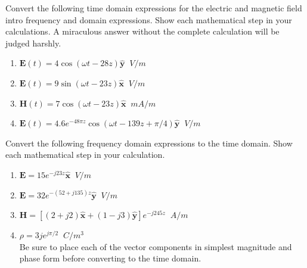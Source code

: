 \documentclass[11pt]{article}
\begin{document}
\makeAssignmentTitle

\begin{homeworkProblem}

Convert the following time domain expressions for the electric and magnetic field intro frequency and domain expressions. 
Show each mathematical step in your calculations. A miraculous answer without the complete calculation will be judged harshly.

\begin{enumerate}[label=(\alph*), topsep=5pt, itemsep=0pt]
    \item $\mathbf{E}(t)=4 \cos (\omega t-28 z) \hat{\mathbf{y}} \;\; \unit{V/m}$
    \item $\mathbf{E}(t)=9 \sin (\omega t-23 z) \hat{\mathbf{x}} \;\; \unit{V/m}$
    \item $\mathbf{H}(t)=7 \cos (\omega t-23 z) \hat{\mathbf{x}} \;\; \unit{mA/m}$
    \item $\mathbf{E}(t)=4.6 e^{-48 \pi z} \cos (\omega t-139 z+\pi / 4) \hat{\mathbf{y}} \;\; \unit{V/m}$
\end{enumerate} \vspace{1\baselineskip}

\solution



\end{homeworkProblem}

\pagebreak

\begin{homeworkProblem}

Convert the following frequency domain expressions to the time domain. Show each mathematical step in your calculation.

\begin{enumerate}[label=(\alph*), topsep=5pt, itemsep=0pt]
    \item $\mathbf{E} = 15 e^{-j 23 z} \hat{\mathbf{x}} \;\; \unit{V/m}$
    \item $\mathbf{E} = 32 e^{-(52 + j 135) z} \hat{\mathbf{y}} \;\; \unit{V/m}$
    \item $\mathbf{H} = [(2 + j2) \hat{\mathbf{x}} + (1 - j 3) \hat{\mathbf{y}}] e^{-j 245 z} \;\; \unit{A/m}$
    \item $\rho = 3 j e^{j\pi/2} \;\; \unit{C/m^3}$ \\
    Be sure to place each of the vector components in simplest magnitude and phase form before
    converting to the time domain.
\end{enumerate} \vspace{1\baselineskip}

\solution



\end{homeworkProblem}
\end{document}

